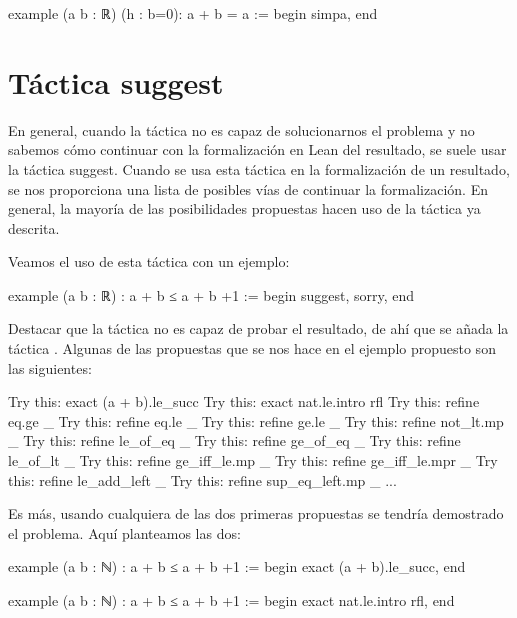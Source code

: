 \begin{leancode}
example (a b : ℝ) (h : b=0): a + b = a :=
begin
  simpa,
end
\end{leancode}

\section{Táctica suggest}

En general, cuando la táctica 
no es capaz de solucionarnos el problema y no sabemos cómo continuar con
la formalización en Lean del resultado, se suele usar la táctica
 {suggest}. Cuando se usa esta táctica en la
formalización de un resultado, se nos proporciona una lista de posibles
vías de continuar la formalización. En general, la mayoría de las
posibilidades propuestas hacen uso de la táctica
 ya descrita.

Veamos el uso de esta táctica con un ejemplo:

\begin{leancode}
example (a b : ℝ) : a + b ≤ a + b +1 :=
begin
  suggest,
  sorry,
end
\end{leancode}

Destacar que la táctica  no es capaz de
probar el resultado, de ahí que se añada la táctica
. Algunas de las propuestas que se nos hace en el
ejemplo propuesto son las siguientes:

\begin{leancode}
Try this: exact (a + b).le_succ
Try this: exact nat.le.intro rfl
Try this: refine eq.ge _
Try this: refine eq.le _
Try this: refine ge.le _
Try this: refine not_lt.mp _
Try this: refine le_of_eq _
Try this: refine ge_of_eq _
Try this: refine le_of_lt _
Try this: refine ge_iff_le.mp _
Try this: refine ge_iff_le.mpr _
Try this: refine le_add_left _
Try this: refine sup_eq_left.mp _
...
\end{leancode}

Es más, usando cualquiera de las dos primeras propuestas se tendría
demostrado el problema. Aquí planteamos las dos:

\begin{leancode}
example (a b : ℕ) : a + b ≤ a + b +1 :=
begin
  exact (a + b).le_succ,
end

example (a b : ℕ) : a + b ≤ a + b +1 :=
begin
  exact nat.le.intro rfl,
end
\end{leancode}


